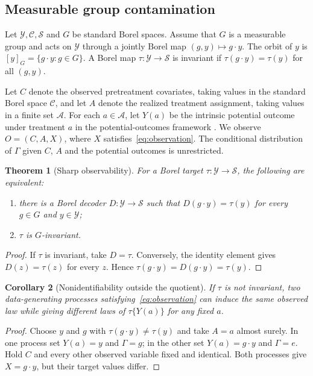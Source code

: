 \documentclass[11pt]{article}
\theoremstyle{plain}
\newtheorem{theorem}{Theorem}[section]
\newtheorem{corollary}[theorem]{Corollary}
\theoremstyle{definition}
\numberwithin{equation}{section}
\newcommand{\1}{\mathbf 1}
\newcommand{\calA}{\mathcal A}
\newcommand{\calC}{\mathcal C}
\newcommand{\calS}{\mathcal S}
\newcommand{\calY}{\mathcal Y}
\begin{document}
\subsection{Measurable group contamination}

Let $\calY,\calC,\calS$ and $G$ be standard Borel spaces. Assume that $G$ is a measurable group and acts on $\calY$ through a jointly Borel map $(g,y)\mapsto g\cdot y$. The orbit of $y$ is $[y]_G=\{g\cdot y:g\in G\}$. A Borel map $\tau:\calY\to\calS$ is invariant if $\tau(g\cdot y)=\tau(y)$ for all $(g,y)$.

Let $C$ denote the observed pretreatment covariates, taking values in the standard Borel space $\calC$, and let $A$ denote the realized treatment assignment, taking values in a finite set $\calA$. For each $a\in\calA$, let $Y(a)$ be the intrinsic potential outcome under treatment $a$ in the potential-outcomes framework \citep{Rubin1974}. We observe $O=(C,A,X)$, where $X$ satisfies~\eqref{eq:observation}. The conditional distribution of $\Gamma$ given $C$, $A$ and the potential outcomes is unrestricted.

\begin{theorem}[Sharp observability]\label{thm:observability}
For a Borel target $\tau:\calY\to\calS$, the following are equivalent:
\begin{enumerate}
\item there is a Borel decoder $D:\calY\to\calS$ such that $D(g\cdot y)=\tau(y)$ for every $g\in G$ and $y\in\calY$;
\item $\tau$ is $G$-invariant.
\end{enumerate}
\end{theorem}

\begin{proof}
If $\tau$ is invariant, take $D=\tau$. Conversely, the identity element gives $D(z)=\tau(z)$ for every $z$. Hence $\tau(g\cdot y)=D(g\cdot y)=\tau(y)$.
\end{proof}

\begin{corollary}[Nonidentifiability outside the quotient]\label{cor:nonid}
If $\tau$ is not invariant, two data-generating processes satisfying~\eqref{eq:observation} can induce the same observed law while giving different laws of $\tau\{Y(a)\}$ for any fixed $a$.
\end{corollary}

\begin{proof}
Choose $y$ and $g$ with $\tau(g\cdot y)\ne\tau(y)$ and take $A=a$ almost surely. In one process set $Y(a)=y$ and $\Gamma=g$; in the other set $Y(a)=g\cdot y$ and $\Gamma=e$. Hold $C$ and every other observed variable fixed and identical. Both processes give $X=g\cdot y$, but their target values differ.
\end{proof}
\end{document}
